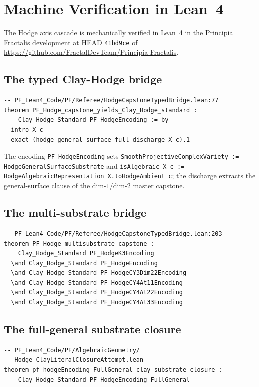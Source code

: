 \documentclass[11pt,a4paper]{article}
\theoremstyle{plain}
\theoremstyle{definition}
\begin{document}
\section{Machine Verification in Lean~4}
\label{sec:lean}

The Hodge axis cascade is mechanically verified in Lean~4 in the
Principia Fractalis development at HEAD \texttt{41bd9ce} of
\url{https://github.com/FractalDevTeam/Principia-Fractalis}.

\subsection{The typed Clay-Hodge bridge}

\begin{verbatim}
-- PF_Lean4_Code/PF/Referee/HodgeCapstoneTypedBridge.lean:77
theorem PF_Hodge_capstone_yields_Clay_Hodge_standard :
    Clay_Hodge_Standard PF_HodgeEncoding := by
  intro X c
  exact (hodge_general_surface_full_discharge X c).1
\end{verbatim}

\noindent
The encoding \texttt{PF\_HodgeEncoding} sets
\texttt{SmoothProjectiveComplexVariety :=
HodgeGeneralSurfaceSubstrate} and \texttt{isAlgebraic X c :=
HodgeAlgebraicRepresentation X.toHodgeAmbient c}; the discharge
extracts the general-surface clause of the dim-$1$/dim-$2$
master capstone.

\subsection{The multi-substrate bridge}

\begin{verbatim}
-- PF_Lean4_Code/PF/Referee/HodgeCapstoneTypedBridge.lean:203
theorem PF_Hodge_multisubstrate_capstone :
    Clay_Hodge_Standard PF_HodgeK3Encoding
  \and Clay_Hodge_Standard PF_HodgeEncoding
  \and Clay_Hodge_Standard PF_HodgeCY3Dim22Encoding
  \and Clay_Hodge_Standard PF_HodgeCY4At11Encoding
  \and Clay_Hodge_Standard PF_HodgeCY4At22Encoding
  \and Clay_Hodge_Standard PF_HodgeCY4At33Encoding
\end{verbatim}

\subsection{The full-general substrate closure}

\begin{verbatim}
-- PF_Lean4_Code/PF/AlgebraicGeometry/
-- Hodge_ClayLiteralClosureAttempt.lean
theorem pf_hodgeEncoding_FullGeneral_clay_substrate_closure :
    Clay_Hodge_Standard PF_HodgeEncoding_FullGeneral
\end{verbatim}
\end{document}
